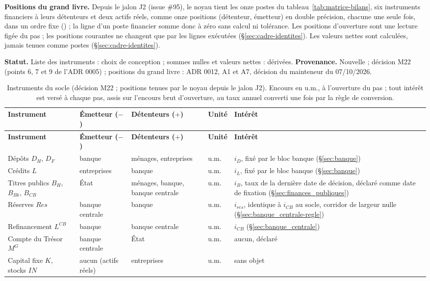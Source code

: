 \documentclass[11pt,a4paper]{article}
\newcommand{\code}[1]{\texttt{\detokenize{#1}}}
\begin{document}
\textbf{Positions du grand livre.} Depuis le jalon J2 (issue \#95), le noyau tient les onze postes du tableau~\ref{tab:matrice-bilans}, six instruments financiers à leurs détenteurs et deux actifs réels, comme onze positions (détenteur, émetteur) en double précision, chacune une seule fois, dans un ordre fixe (\code{nations.noyau.catalogue.POSTES}) ; la ligne d'un poste financier somme donc à zéro sans calcul ni tolérance. Les positions d'ouverture sont une lecture figée du pas ; les positions courantes ne changent que par les lignes exécutées (\S\ref{sec:cadre-identites}). Les valeurs nettes sont calculées, jamais tenues comme postes (\S\ref{sec:cadre-identites}).

\textbf{Statut.} Liste des instruments : choix de conception ; sommes nulles et valeurs nettes : dérivées. \textbf{Provenance.} Nouvelle ; décision M22 (points 6, 7 et 9 de l'ADR 0005) ; positions du grand livre : ADR 0012, A1 et A7, décision du mainteneur du 07/10/2026.

\begin{center}\small
\begin{longtable}{>{\raggedright\arraybackslash}p{2.8cm}>{\raggedright\arraybackslash}p{2.1cm}>{\raggedright\arraybackslash}p{2.5cm}>{\raggedright\arraybackslash}p{1.0cm}>{\raggedright\arraybackslash}p{5.3cm}}
\caption{Instruments du socle (décision M22 ; positions tenues par le noyau depuis le jalon J2). Encours en u.m., à l'ouverture du pas ; tout intérêt est versé à chaque pas, assis sur l'encours brut d'ouverture, au taux annuel converti une fois par la règle de conversion.}\label{tab:instruments}\\
\toprule
\textbf{Instrument} & \textbf{Émetteur ($-$)} & \textbf{Détenteurs ($+$)} & \textbf{Unité} & \textbf{Intérêt}\\
\midrule
\endfirsthead
\toprule
\textbf{Instrument} & \textbf{Émetteur ($-$)} & \textbf{Détenteurs ($+$)} & \textbf{Unité} & \textbf{Intérêt}\\
\midrule
\endhead
Dépôts $D_H$, $D_F$ & banque & ménages, entreprises & u.m. & $i_D$, fixé par le bloc banque (\S\ref{sec:banque})\\
Crédits $L$ & entreprises & banque & u.m. & $i_L$, fixé par le bloc banque (\S\ref{sec:banque})\\
Titres publics $B_H$, $B_{\mathit{Bk}}$, $B_{\mathit{CB}}$ & État & ménages, banque, banque centrale & u.m. & $i_B$, taux de la dernière date de décision, déclaré comme date de fixation (\S\ref{sec:finances_publiques})\\
Réserves $\mathit{Res}$ & banque centrale & banque & u.m. & $i_{\mathit{res}}$, identique à $i_{\mathit{CB}}$ au socle, corridor de largeur nulle (\S\ref{sec:banque_centrale-regle})\\
Refinancement $L^{\mathit{CB}}$ & banque & banque centrale & u.m. & $i_{\mathit{CB}}$ (\S\ref{sec:banque_centrale})\\
Compte du Trésor $M^G$ & banque centrale & État & u.m. & aucun, déclaré\\
Capital fixe $K$, stocks $\mathit{IN}$ & aucun (actifs réels) & entreprises & u.m. & sans objet\\
\bottomrule
\end{longtable}
\end{center}
\end{document}
